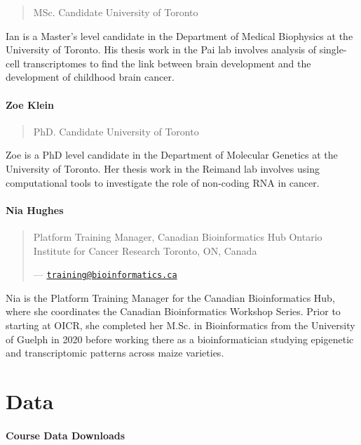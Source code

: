 \documentclass[
]{book}
\begin{document}
\begin{quote}
MSc. Candidate
University of Toronto
\end{quote}

Ian is a Master's level candidate in the Department of Medical Biophysics at the University of Toronto. His thesis work in the Pai lab involves analysis of single-cell transcriptomes to find the link between brain development and the development of childhood brain cancer.

\subsubsection{Zoe Klein}\label{zoe-klein}

\begin{quote}
PhD. Candidate
University of Toronto
\end{quote}

Zoe is a PhD level candidate in the Department of Molecular Genetics at the University of Toronto. Her thesis work in the Reimand lab involves using computational tools to investigate the role of non-coding RNA in cancer.

\subsubsection{Nia Hughes}\label{nia-hughes}

\begin{quote}
Platform Training Manager, Canadian Bioinformatics Hub
Ontario Institute for Cancer Research
Toronto, ON, Canada

--- \href{mailto:training@bioinformatics.ca}{\nolinkurl{training@bioinformatics.ca}}
\end{quote}

Nia is the Platform Training Manager for the Canadian Bioinformatics Hub, where she coordinates the Canadian Bioinformatics Workshop Series. Prior to starting at OICR, she completed her M.Sc. in Bioinformatics from the University of Guelph in 2020 before working there as a bioinformatician studying epigenetic and transcriptomic patterns across maize varieties.

\chapter{Data}\label{data}

\subsubsection{Course Data Downloads}\label{course-data-downloads}
\end{document}
